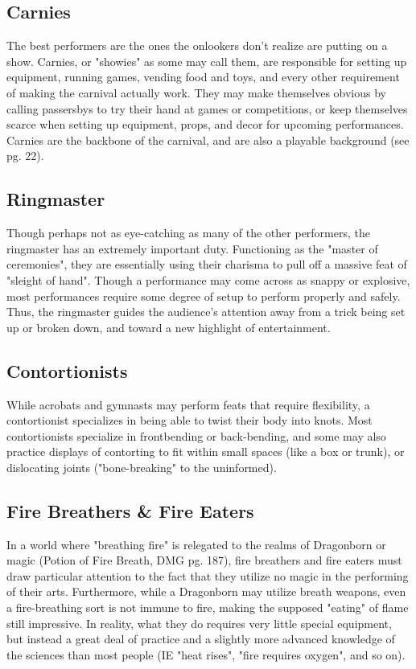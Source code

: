 \documentclass[10pt,a4paper,twoside,bg=print,twocolumn,openany,nodeprecatedcode]{dndbook}
\begin{document}
\subsection{Carnies}
The best performers are the ones the onlookers don't realize are putting on a show. Carnies, or "showies" as some may call them, are responsible for setting up equipment, running games, vending food and toys, and every other requirement of making the carnival actually work. They may make themselves obvious by calling passersbys to try their hand at games or competitions, or keep themselves scarce when setting up equipment, props, and decor for upcoming performances. Carnies are the backbone of the carnival, and are also a playable background (see pg. 22).
\subsection{Ringmaster}
Though perhaps not as eye-catching as many of the other performers, the ringmaster has an extremely important duty. Functioning as the "master of ceremonies", they are essentially using their charisma to pull off a massive feat of "sleight of hand". Though a performance may come across as snappy or explosive, most performances require some degree of setup to perform properly and safely. Thus, the ringmaster guides the audience's attention away from a trick being set up or broken down, and toward a new highlight of entertainment.
\subsection{Contortionists}
While acrobats and gymnasts may perform feats that require flexibility, a contortionist specializes in being able to twist their body into knots. Most contortionists specialize in frontbending or back-bending, and some may also practice displays of contorting to fit within small spaces (like a box or trunk), or dislocating joints ("bone-breaking" to the uninformed).
\subsection{Fire Breathers \& Fire Eaters}
In a world where "breathing fire" is relegated to the realms of Dragonborn or magic (Potion of Fire Breath, DMG pg. 187), fire breathers and fire eaters must draw particular attention to the fact that they utilize no magic in the performing of their arts. Furthermore, while a Dragonborn may utilize breath weapons, even a fire-breathing sort is not immune to fire, making the supposed "eating" of flame still impressive. In reality, what they do requires very little special equipment, but instead a great deal of practice and a slightly more advanced knowledge of the sciences than most people (IE "heat rises", "fire requires oxygen", and so on).
\end{document}
